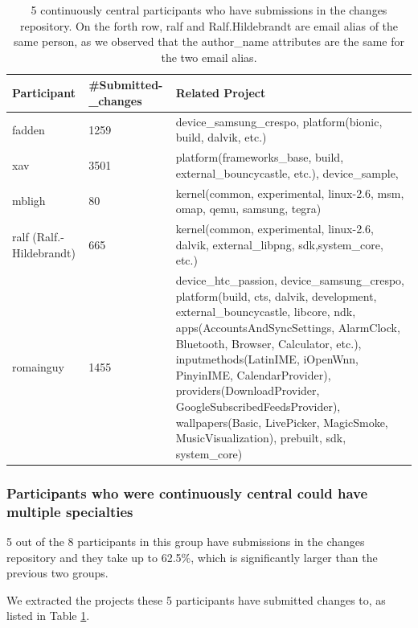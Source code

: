 \documentclass[10pt, conference, compsocconf]{IEEEtran}
\begin{document}
\begin{table}[!t]
\caption{5 continuously central participants who have submissions in the changes repository. On the forth row, ralf and Ralf.Hildebrandt are email alias of the same person, as we observed that the author\_name attributes are the same for the two email alias.}
\label{continuous_project}
\centering
\begin{tabular}{|p{1.2cm}|p{1.1cm}|p{4.6cm}|}
\hline
Participant & \#Submitted-\_changes & Related Project \\
\hline
fadden & 1259 & device\_samsung\_crespo, platform(bionic, build, dalvik, etc.) \\
\hline
xav & 3501 & platform(frameworks\_base, build, external\_bouncycastle, etc.), device\_sample, \\
\hline
mbligh & 80 & kernel(common, experimental, linux-2.6, msm, omap, qemu, samsung, tegra) \\
\hline
ralf (Ralf.-Hildebrandt) & 665 & kernel(common, experimental, linux-2.6, dalvik, external\_libpng, sdk,system\_core, etc.) \\
\hline
romainguy & 1455 & device\_htc\_passion, device\_samsung\_crespo, platform(build, cts, dalvik, development, external\_bouncycastle, libcore, ndk, apps(AccountsAndSyncSettings, AlarmClock,
Bluetooth, Browser, Calculator, etc.),
inputmethods(LatinIME, iOpenWnn, PinyinIME, CalendarProvider),
providers(DownloadProvider, GoogleSubscribedFeedsProvider), wallpapers(Basic, LivePicker,
MagicSmoke, MusicVisualization), prebuilt, sdk, system\_core) \\
\hline
\end{tabular}
\end{table}


\subsubsection{Participants who were continuously central could have multiple specialties}
5 out of the 8 participants in this group have submissions in the changes repository and they take up to 62.5\%, which is significantly larger than the previous two groups.

We extracted the projects these 5 participants have submitted changes to, as listed in Table \ref{continuous_project}.
\end{document}
